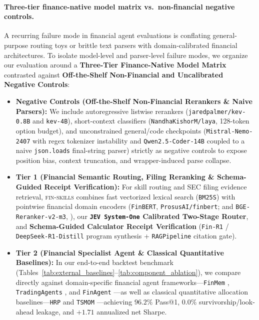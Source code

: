 \paragraph{Three-tier finance-native model matrix vs.\ non-financial negative controls.}
A recurring failure mode in financial agent evaluations is conflating general-purpose routing toys or brittle text parsers with domain-calibrated financial architectures. To isolate model-level and parser-level failure modes, we organize our evaluation around a \textbf{Three-Tier Finance-Native Model Matrix} contrasted against \textbf{Off-the-Shelf Non-Financial and Uncalibrated Negative Controls}:
\begin{itemize}[leftmargin=*,nosep,topsep=2pt]
    \item \textbf{Negative Controls (Off-the-Shelf Non-Financial Rerankers \& Naive Parsers):} We include autoregressive listwise rerankers (\texttt{jaredpalmer/kev-0.8B} and \texttt{kev-4B}), short-context classifiers (\texttt{NandhaKishorM/laya}, 128-token option budget), and unconstrained general/code checkpoints (\texttt{Mistral-Nemo-2407} with regex tokenizer instability and \texttt{Qwen2.5-Coder-14B} coupled to a naive \texttt{json.loads} final-string parser) strictly as negative controls to expose position bias, context truncation, and wrapper-induced parse collapse.
    \item \textbf{Tier 1 (Financial Semantic Routing, Filing Reranking \& Schema-Guided Receipt Verification):} For skill routing and SEC filing evidence retrieval, \textsc{fin-skills} combines fast vectorized lexical search (\texttt{BM25S}) with pointwise financial domain encoders (\texttt{FinBERT}, \texttt{ProsusAI/finbert}; and \texttt{BGE-Reranker-v2-m3}, \citealt{chen2024bgem3}), our \textbf{\texttt{JEV System-One} Calibrated Two-Stage Router}, and \textbf{Schema-Guided Calculator Receipt Verification} (\texttt{Fin-R1} / \texttt{DeepSeek-R1-Distill} program synthesis + \texttt{RAGPipeline} citation gate).
    \item \textbf{Tier 2 (Financial Specialist Agent \& Classical Quantitative Baselines):} In our end-to-end backtest benchmark (Tables~\ref{tab:external_baselines}--\ref{tab:component_ablation}), we compare directly against domain-specific financial agent frameworks---\texttt{FinMem} \citep{yu2024finmem}, \texttt{TradingAgents} \citep{xiao2024tradingagents}, and \texttt{FinAgent} \citep{zhang2024finagent}---as well as classical quantitative allocation baselines---\texttt{HRP} \citep{lopezdeprado2016hrp} and \texttt{TSMOM} \citep{moskowitz2012time}---achieving $96.2\%$ Pass@1, $0.0\%$ survivorship/look-ahead leakage, and $+1.71$ annualized net Sharpe.

\end{itemize}
